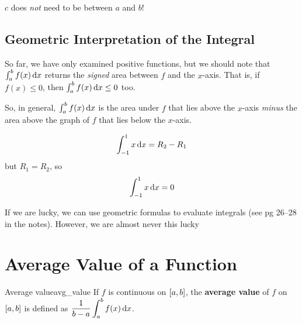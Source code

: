 \begin{Remark}{}{}
    $ c $ does \emph{not} need to be between $ a $ and $ b $!
\end{Remark}

\subsection*{Geometric Interpretation of the Integral}
So far, we have only examined positive functions, but we should note that $ \int_{a}^{b} f(x)\odif{x} $
returns the \emph{signed} area between $ f $ and the $ x $-axis. That is, if $ f(x)\le 0 $, then
$ \int_{a}^{b} f(x)\odif{x}\le 0 $ too.

So, in general, $ \int_{a}^{b} f(x)\odif{x} $ is the area under $ f $ that
lies above the $ x $-axis \emph{minus} the area above the graph of
$ f $ that lies below the $ x $-axis.

\begin{Example}{}{}
    \[ \int_{-1}^{1}x\odif{x}=R_2-R_1 \]
    but $ R_1=R_2 $, so
    \[ \int_{-1}^{1}x\odif{x}=0 \]
    \begin{center}
    \end{center}
\end{Example}

\begin{Remark}{}{}
    If we are lucky, we can use geometric formulas to evaluate integrals
    (see pg 26--28 in the notes). However, we are almost never this lucky\textellipsis{}
\end{Remark}

\section{Average Value of a Function}

\begin{Definition}{Average value}{avg_value}
    If $ f $ is continuous on $ \interval{a}{b} $, the \textbf{average value} of $ f $
    on $ \interval{a}{b} $ is defined as
    $ \displaystyle \frac{1}{b-a} \int_{a}^{b} f(x)\odif{x} $.
\end{Definition}

